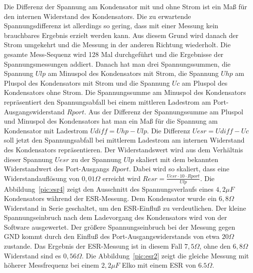 Die Differenz der Spannung am Kondensator mit und ohne Strom ist ein Maß für den internen Widerstand des Kondensators.
Die zu erwartende Spannungsdifferenz ist allerdings so gering, dass mit einer Messung kein brauchbares Ergebnis erzielt
werden kann.
Aus diesem Grund wird danach der Strom umgekehrt und die Messung in der anderen Richtung wiederholt.
Die gesamte Mess-Sequenz wird 128 Mal durchgeführt und die Ergebnisse der Spannungsmessungen addiert.
Danach hat man drei Spannungssummen, die Spannung \(Ulp\) am Minuspol des Kondensators mit Strom, die Spannung \(Uhp\) am
Pluspol des Kondensators mit Strom und die Spannung \(Uc\) am Pluspol des Kondensators ohne Strom.
Die Spannungssumme am Minuspol des Kondensators repräsentiert den Spannungsabfall bei einem mittleren
Ladestrom am Port-Ausgangswiderstand \(Rport\). Aus der Differenz der Spannungssumme am Pluspol und Minuspol des Kondensators
hat man ein Maß für die Spannung am Kondensator mit Ladestrom \(Udiff = Uhp - Ulp\).
Die Differenz \(Uesr = Udiff - Uc\) soll jetzt den Spannungsabfall bei mittlerem Ladestrom am internen Widerstand des Kondensators
repräsentieren.
Der Widerstandswert wird aus dem Verhältnis dieser Spannung \(Uesr\) zu der Spannung \(Ulp\) skaliert mit dem
bekannten Widerstandwert des Port-Ausgangs \(Rport\). Dabei wird so skaliert, dass eine Widerstandauflösung von
\(0,01 \Omega\) erreicht wird \(Resr = \frac{Uesr \cdot 10 \cdot Rport}{Ulp}\).
Die Abbildung~\ref{pic:esr4} zeigt den Ausschnitt des Spannungsverlaufs eines \(4,2\mu F\) Kondensators
 während der ESR-Messung. Dem Kondensator wurde ein \(6,8 \Omega\) Widerstand in Serie geschaltet, um den ESR-Einfluß
zu verdeutlichen. Der kleine Spannungseinbruch nach dem Ladevorgang des Kondensators wird von der Software ausgewertet.
Der größere Spannungseinbruch bei der Messung gegen GND kommt durch den Einfluß des Port-Ausgangswiderstands von etwa \(20\Omega\) zustande.
Das Ergebnis der ESR-Messung ist in diesem Fall \(7,5 \Omega\), ohne den \(6,8 \Omega\) Widerstand sind es \(0,56\Omega\).
Die Abbildung~\ref{pic:esr2} zeigt die gleiche Messung mit höherer Messfrequenz bei einem \(2,2\mu F\) Elko mit einem ESR von \(6.5\Omega\).


